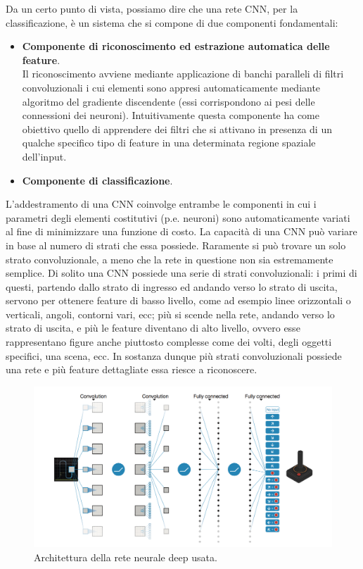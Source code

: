 \documentclass[twoside,twocolumn,10pt]{extarticle}
\theoremstyle{definition}
\begin{document}
Da un certo punto di vista, possiamo dire che una rete CNN, per la classificazione, è un sistema che si compone di due componenti fondamentali:
\begin{itemize}
	\item 
	\textbf{Componente di riconoscimento ed estrazione automatica delle feature}. \\Il riconoscimento avviene mediante applicazione di banchi paralleli di filtri convoluzionali i cui elementi sono appresi automaticamente mediante algoritmo del gradiente discendente (essi corrispondono ai pesi delle connessioni dei neuroni). Intuitivamente questa componente ha come obiettivo quello di apprendere dei filtri che si attivano in presenza di un qualche specifico tipo di feature in una determinata regione spaziale dell’input.
	\item
	\textbf{Componente di classificazione}.
\end{itemize}
L’addestramento di una CNN coinvolge entrambe le componenti in cui i parametri degli elementi costitutivi (p.e. neuroni) sono automaticamente variati al fine di minimizzare una funzione di costo.
La capacità di una CNN può variare in base al numero di strati che essa possiede. Raramente si può trovare un solo strato convoluzionale, a meno che la rete in questione non sia estremamente semplice. Di solito una CNN possiede una serie di strati convoluzionali: i primi di questi, partendo dallo strato di ingresso ed andando verso lo strato di uscita, servono per ottenere feature di basso livello, come ad esempio linee orizzontali o verticali, angoli, contorni vari, ecc; più si scende nella rete, andando verso lo strato di uscita, e più le feature diventano di alto livello, ovvero esse rappresentano figure anche piuttosto complesse come dei volti, degli oggetti specifici, una scena, ecc. In sostanza dunque più strati convoluzionali possiede una rete e più feature dettagliate essa riesce a riconoscere. 

\begin{figure}[h]
	\centering
	\includegraphics[scale=.33]{images/cnnDQN.jpg}
	\caption{Architettura della rete neurale deep usata.}
	\label{fig:cnnDQN}
\end{figure}
\end{document}
